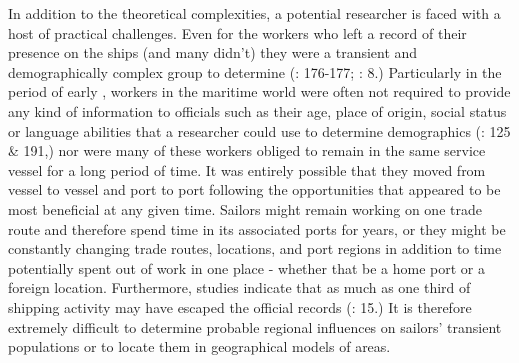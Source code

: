   In addition to the theoretical complexities, a potential researcher is faced with a host of practical challenges. Even for the workers who left a record of their presence on the ships (and many didn’t) they were a transient and demographically complex group to determine (\citealt{AdkinsAdkins2008}: 176-177; \citealt{Fusaro2015}: 8.) Particularly in the period of early , workers in the maritime world were often not required to provide any kind of information to officials such as their age, place of origin, social status or language abilities that a researcher could use to determine demographics (\citealt{Litter1999}: 125 \& 191,) nor were many of these workers obliged to remain in the same service vessel for a long period of time. It was entirely possible that they moved from vessel to vessel and port to port following the opportunities that appeared to be most beneficial at any given time. Sailors might remain working on one trade route and therefore spend time in its associated ports for years, or they might be constantly changing trade routes, locations, and port regions in addition to time potentially spent out of work in one place - whether that be a home port or a foreign location. Furthermore, studies indicate that as much as one third of shipping activity may have escaped the official records (\citealt{Cook2005}: 15.) It is therefore extremely difficult to determine probable regional influences on sailors’ transient populations or to locate them in geographical models of  areas.



